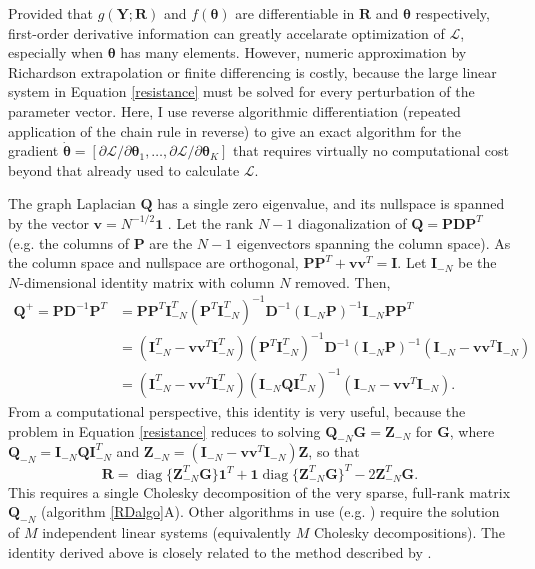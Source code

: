 \documentclass[11pt]{article}
\DeclareMathOperator*{\diag}{diag}
\newcommand{\mat}[1]{\mathbf{#1}}
\begin{document}
Provided that $g(\mat Y; \mat R)$ and $f(\bm \theta)$ are differentiable in
$\mat R$ and $\bm \theta$ respectively, first-order derivative information can
greatly accelarate optimization of $\mathcal{L}$,
especially when $\bm \theta$ has many elements. 
However, numeric approximation by Richardson extrapolation or finite differencing
is costly, because the large linear system in Equation \ref{resistance} must be
solved for every perturbation of the parameter vector.
Here, I use reverse algorithmic differentiation (repeated application of the chain
rule in reverse) to give an exact algorithm for the gradient
$\dot{\bm \theta} = [\partial \mathcal{L}/\partial \bm \theta_1, \dots, \partial \mathcal{L}/\partial \bm \theta_K]$ 
that requires virtually no computational cost beyond that already used to calculate
$\mathcal{L}$.

The graph Laplacian $\mat Q$ has a single zero eigenvalue, and its nullspace is
spanned by the vector $\mat v = N^{-1/2} \mat 1$ \cite{missing}. Let the rank $N-1$
diagonalization of $\mat Q = \mat P \mat D \mat P^T$ (e.g. the columns of $\mat
P$ are the $N-1$ eigenvectors spanning the column space). As the column space
and nullspace are orthogonal, $\mat P \mat P^T + \mat v \mat v^T = \mat I$. 
Let $\mat I_{-N}$ be the $N$-dimensional identity matrix with column $N$ removed. Then, 
\[ 
  \begin{aligned} 
    \mat Q^+ = \mat P \mat D^{-1} \mat P^T 
           & = \mat P \mat P^T \mat I_{-N}^T (\mat P^T \mat I_{-N}^T)^{-1} \mat D^{-1} (\mat I_{-N} \mat P)^{-1} \mat I_{-N} \mat P \mat P^T \\ 
           & = (\mat I_{-N}^T - \mat v \mat v^T \mat I_{-N}^T) (\mat P^T \mat I_{-N}^T)^{-1} \mat D^{-1} (\mat I_{-N} \mat P)^{-1} (\mat I_{-N} - \mat v \mat v^T \mat I_{-N}) \\ 
           & = (\mat I_{-N}^T - \mat v \mat v^T \mat I_{-N}^T) (\mat I_{-N} \mat Q \mat I_{-N}^T)^{-1} (\mat I_{-N} - \mat v \mat v^T \mat I_{-N}).
  \end{aligned} 
\] 
From a computational perspective, this identity is very useful, because the
problem in Equation \ref{resistance} reduces to solving 
$\mat Q_{-N} \mat G = \mat Z_{-N}$ for $\mat G$, where 
$\mat Q_{-N} = \mat I_{-N} \mat Q \mat I_{-N}^T$ and 
$\mat Z_{-N} = (\mat I_{-N} - \mat v \mat v^T \mat I_{-N}) \mat Z$, 
so that
\[
  \mat R = \diag \{ \mat Z_{-N}^T \mat G \} \mat 1^T + \mat 1 \diag \{\mat Z_{-N}^T \mat G \}^T - 2 \mat Z_{-N}^T \mat G.
\]
This requires a single Cholesky decomposition of the very sparse, full-rank
matrix $\mat Q_{-N}$ (algorithm \ref{RDalgo}A). Other algorithms in use (e.g. \cite{missing})
require the solution of $M$ independent linear systems (equivalently $M$
Cholesky decompositions). The identity derived above is closely related to the
method described by \cite{missing}.
\end{document}

